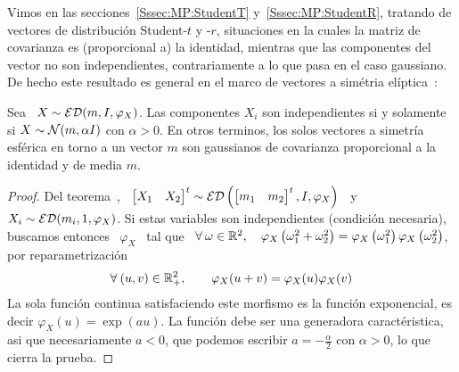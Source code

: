 Vimos   en   las  secciones~\ref{Sssec:MP:StudentT}   y~\ref{Sssec:MP:StudentR},
tratando de  vectores de  distribuci\'on Student-$t$ y  -$r$, situaciones  en la
cuales la  matriz de covarianza es  (proporcional a) la  identidad, mientras que
las componentes del  vector no son independientes, contrariamente  a lo que pasa
en  el caso  gaussiano.   De hecho  este resultado  es  general en  el marco  de
vectores a sim\'etria el\'iptica~\cite{BilBre99, Max67}:
%
\begin{teorema}\label{Teo:MP:MaxwellHershell}
  Sea \ $X \sim \mathcal{ED}(m,I,\varphi_X)$. Las componentes $X_i$ son independientes si
  y solamente si $X  \sim \mathcal{N}(m, \alpha I)$ con $\alpha >  0$. En otros terminos,
  los  solos vectores  a  simetr\'ia esf\'erica  en  torno a  un  vector $m$  son
  gaussianos de covarianza proporcional a la identidad y de media $m$.
\end{teorema}
%
\begin{proof}
  Del teorema~\cite{Teo:MP:TranformacionAfinEliptica},  \ $\begin{bmatrix} X_1 &
    X_2    \end{bmatrix}^t     \sim    \mathcal{ED}\left(    \begin{bmatrix}     m_1    &
      m_2 \end{bmatrix}^t, I, \varphi_X \right)$ \ y  \ $X_i \sim \mathcal{ED}( m_i , 1 ,
  \varphi_X)$.  Si  estas variables son  independientes (condici\'on necesaria),
  buscamos entonces  \ $\varphi_X$ \ tal  que \ $\forall \:  \omega \in \mathbb{R}^2,
  \quad  \varphi_X\left(  \omega_1^2  +  \omega_2^2  \right)  =  \varphi_X\left(
    \omega_1^2   \right)   \varphi_X\left(    \omega_2^2   \right)$,   \ie   por
  reparametrizaci\'on
  \[
  \forall  \:   (u,v)  \in  \mathbb{R}_+^2,  \qquad   \varphi_X(u+v)  =  \varphi_X(u)
  \varphi_X(v)
  \]
  La  sola  funci\'on  continua  satisfaciendo  este morfismo  es  la  funci\'on
  exponencial, es decir  $\varphi_X(u) = \exp(a u)$.  La  funci\'on debe ser una
  generadora  caract\'eristica, asi  que  necesariamente $a  <  0$, que  podemos
  escribir $a = - \frac{\alpha}{2}$ con $\alpha > 0$, lo que cierra la prueba.
\end{proof}

